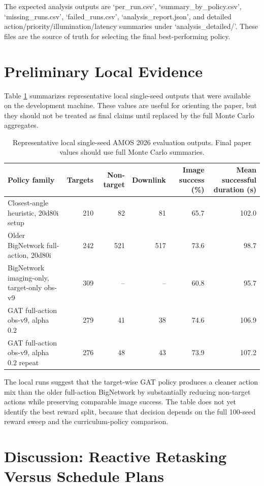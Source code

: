 \documentclass{amos}
\begin{document}
The expected analysis outputs are `per\_run.csv', `summary\_by\_policy.csv', `missing\_runs.csv', `failed\_runs.csv', `analysis\_report.json', and detailed action/priority/illumination/latency summaries under `analysis\_detailed/'. These files are the source of truth for selecting the final best-performing policy.

\section{Preliminary Local Evidence}

Table \ref{tab:local-single-seed} summarizes representative local single-seed outputs that were available on the development machine. These values are useful for orienting the paper, but they should not be treated as final claims until replaced by the full Monte Carlo aggregates.

\begin{table}[h!]
\centering
\caption{Representative local single-seed AMOS 2026 evaluation outputs. Final paper values should use full Monte Carlo summaries.}
\label{tab:local-single-seed}
\begin{tabular}{lrrrrr}
\toprule
Policy family & Targets & Non-target & Downlink & Image success (\%) & Mean successful duration (s) \\
\midrule
Closest-angle heuristic, 20d80i setup & 210 & 82 & 81 & 65.7 & 102.0 \\
Older BigNetwork full-action, 20d80i & 242 & 521 & 517 & 73.6 & 98.7 \\
BigNetwork imaging-only, target-only obs-v9 & 309 & -- & -- & 60.8 & 95.7 \\
GAT full-action obs-v9, alpha 0.2 & 279 & 41 & 38 & 74.6 & 106.9 \\
GAT full-action obs-v9, alpha 0.2 repeat & 276 & 48 & 43 & 73.9 & 107.2 \\
\bottomrule
\end{tabular}
\end{table}

The local runs suggest that the target-wise GAT policy produces a cleaner action mix than the older full-action BigNetwork by substantially reducing non-target actions while preserving comparable image success. The table does not yet identify the best reward split, because that decision depends on the full 100-seed reward sweep and the curriculum-policy comparison.

\section{Discussion: Reactive Retasking Versus Schedule Plans}
\end{document}
